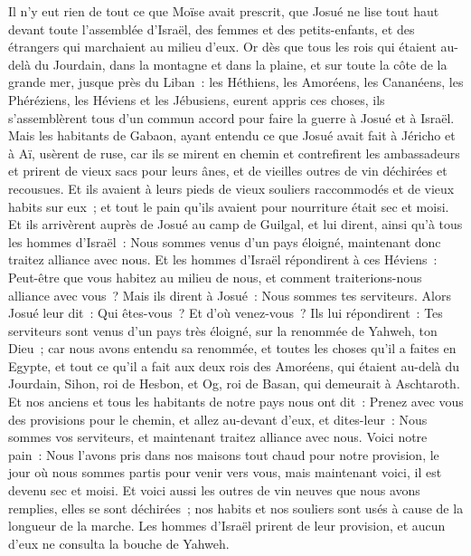 \begin{multicols}{2}
Il n'y eut rien de tout ce que Moïse avait prescrit, que Josué ne lise tout haut devant toute l'assemblée d'Israël, des femmes et des petits-enfants, et des étrangers qui marchaient au milieu d'eux.
\VerseOne{}Or dès que tous les rois qui étaient au-delà du Jourdain, dans la montagne et dans la plaine, et sur toute la côte de la grande mer, jusque près du Liban~: les Héthiens, les Amoréens, les Cananéens, les Phéréziens, les Héviens et les Jébusiens, eurent appris ces choses,
ils s'assemblèrent tous d'un commun accord pour faire la guerre à Josué et à Israël.
Mais les habitants de Gabaon, ayant entendu ce que Josué avait fait à Jéricho et à Aï,
usèrent de ruse, car ils se mirent en chemin et contrefirent les ambassadeurs et prirent de vieux sacs pour leurs ânes, et de vieilles outres de vin déchirées et recousues.
Et ils avaient à leurs pieds de vieux souliers raccommodés et de vieux habits sur eux~; et tout le pain qu'ils avaient pour nourriture était sec et moisi.
Et ils arrivèrent auprès de Josué au camp de Guilgal, et lui dirent, ainsi qu'à tous les hommes d'Israël~: Nous sommes venus d'un pays éloigné, maintenant donc traitez alliance avec nous.
Et les hommes d'Israël répondirent à ces Héviens~: Peut-être que vous habitez au milieu de nous, et comment traiterions-nous alliance avec vous~?
Mais ils dirent à Josué~: Nous sommes tes serviteurs. Alors Josué leur dit~: Qui êtes-vous~? Et d'où venez-vous~?
Ils lui répondirent~: Tes serviteurs sont venus d'un pays très éloigné, sur la renommée de Yahweh, ton Dieu~; car nous avons entendu sa renommée, et toutes les choses qu'il a faites en Egypte,
et tout ce qu'il a fait aux deux rois des Amoréens, qui étaient au-delà du Jourdain, Sihon, roi de Hesbon, et Og, roi de Basan, qui demeurait à Aschtaroth.
Et nos anciens et tous les habitants de notre pays nous ont dit~: Prenez avec vous des provisions pour le chemin, et allez au-devant d'eux, et dites-leur~: Nous sommes vos serviteurs, et maintenant traitez alliance avec nous.
Voici notre pain~: Nous l'avons pris dans nos maisons tout chaud pour notre provision, le jour où nous sommes partis pour venir vers vous, mais maintenant voici, il est devenu sec et moisi.
Et voici aussi les outres de vin neuves que nous avons remplies, elles se sont déchirées~; nos habits et nos souliers sont usés à cause de la longueur de la marche.
Les hommes d'Israël prirent de leur provision, et aucun d'eux ne consulta la bouche de Yahweh.

\end{multicols}
